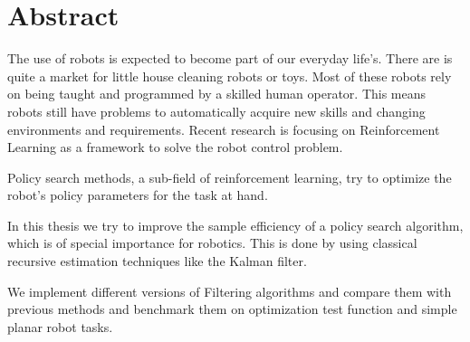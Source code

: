 
\chapter*{Abstract}

The use of robots is expected to become part of our everyday life's.
There are is quite a market for little house cleaning robots or
toys. Most of these robots rely on being
taught and programmed by a skilled human operator.
This means robots still have problems to automatically acquire
new skills and changing environments and requirements.
Recent research is focusing on Reinforcement Learning as a framework
to solve the robot control problem.

Policy search methods, a sub-field of reinforcement learning, try to
optimize the robot's policy parameters for the task at hand.

In this thesis we try to improve the sample efficiency of a policy search algorithm,
which is of special importance for robotics. This is done
by using classical recursive estimation techniques like the Kalman filter.

We implement different versions of Filtering algorithms and compare them with
previous methods and benchmark them on optimization test function and simple
planar robot tasks.